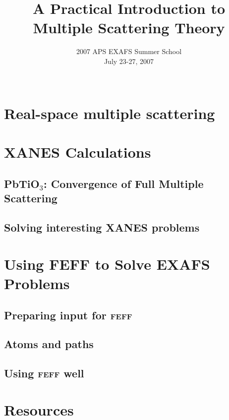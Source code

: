 \documentclass[10pt, xcolor=x11names, compress]{beamer}
\title{A Practical Introduction to Multiple Scattering Theory}
\date[APS EXAFS 07]{2007 APS EXAFS Summer School\\July 23-27, 2007\\~}
\newcommand{\pto}{PbTiO$_3$}
\begin{document}
\begin{frame}
  \titlepage
\end{frame}






\section{Real-space multiple scattering}





\section[XANES]{XANES Calculations}
\subsection[Convergence of XANES]{\pto: Convergence of Full Multiple Scattering}


\subsection[Interesting XANES Problems]{Solving interesting XANES problems}




\section[EXAFS]{Using FEFF to Solve EXAFS Problems}
\subsection[\textsc{feff} input]{Preparing input for \textsc{feff}}

\subsection[Atoms and paths]{Atoms and paths}

\subsection[Good practice]{Using \textsc{feff} well}




\section[Resources]{Resources}

\end{document}

